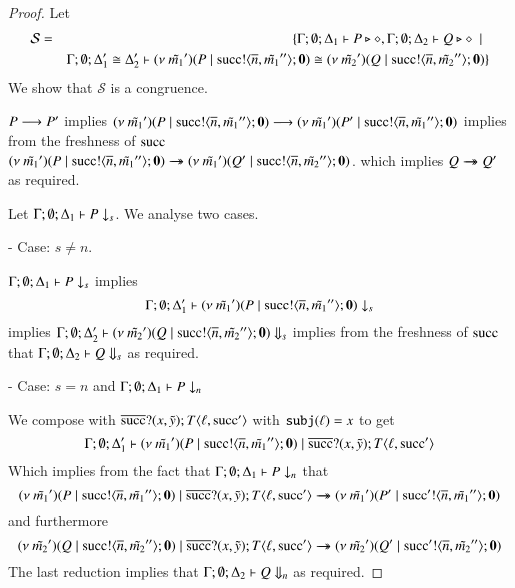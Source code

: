 \begin{proof}
	\noi Let
	\begin{eqnarray*}
		\mathcal{S} &=&	\{\Gamma; \emptyset; \Delta_1 \vdash P \triangleright \diamond, \Gamma; \emptyset; \Delta_2 \vdash Q \triangleright \diamond \ \ |\ \  \\
		& &	\Gamma; \emptyset; \Delta_1' \cong \Delta_2' \vdash (\nu\ \tilde{m_1}')(P \;|\; \textrm{succ} ! \langle \overline{n}, \tilde{m_1}'' \rangle ; \mathbf{0}) \cong (\nu\ \tilde{m_2}')(Q \;|\; \textrm{succ} ! \langle \overline{n}, \tilde{m_2}'' \rangle ; \mathbf{0})
		\}
	\end{eqnarray*}
	\noi We show that $\mathcal{S}$ is a congruence.


	\noi $P \longrightarrow P'$
	implies
	$(\nu\ \tilde{m_1}')(P \;|\; \textrm{succ} ! \langle \overline{n}, \tilde{m_1}'' \rangle ; \mathbf{0}) \longrightarrow (\nu\ \tilde{m_1}')(P' \;|\; \textrm{succ} ! \langle \overline{n}, \tilde{m_1}'' \rangle ; \mathbf{0})$
	implies from the freshness of $\textrm{succ}$
	$(\nu\ \tilde{m_1}')(P \;|\; \textrm{succ} ! \langle \overline{n}, \tilde{m_1}'' \rangle ; \mathbf{0}) \rightarrow\!\!\!\!\!\rightarrow (\nu\ \tilde{m_1}')(Q' \;|\; \textrm{succ} ! \langle \overline{n}, \tilde{m_2}'' \rangle ; \mathbf{0})$.
	which implies
	$Q \rightarrow\!\!\!\!\!\rightarrow Q'$ as required.


	\noi Let $\Gamma; \emptyset; \Delta_1 \vdash P \downarrow_{s}$. We analyse two cases.

	\noi - Case: $s \not= n$.

	\noi $\Gamma; \emptyset; \Delta_1 \vdash P \downarrow_{s}$
	implies
\[
	\Gamma; \emptyset; \Delta_1' \vdash (\nu\ \tilde{m_1}')(P \;|\; \textrm{succ} ! \langle \overline{n}, \tilde{m_1}'' \rangle ; \mathbf{0}) \downarrow_{s}
\]
	\noi implies
	$\Gamma; \emptyset; \Delta_2' \vdash (\nu\ \tilde{m_2}')(Q \;|\; \textrm{succ} ! \langle \overline{n}, \tilde{m_2}'' \rangle ; \mathbf{0}) \Downarrow_{s}$
	implies from the freshness of $\textrm{succ}$ that
	$\Gamma; \emptyset; \Delta_2 \vdash Q \Downarrow_{s}$ as required.

	\noi - Case: $s = n$ and $\Gamma; \emptyset; \Delta_1 \vdash P \downarrow_{n}$

	\noi We compose with $\overline{\textrm{succ}} ? (x, \tilde{y}) ; T\langle \ell, \textrm{succ}' \rangle$ with $\mathtt{subj}(\ell) = x$ to get
\[
	\Gamma; \emptyset; \Delta_1' \vdash (\nu\ \tilde{m_1}')(P \;|\; \textrm{succ} ! \langle \overline{n}, \tilde{m_1}'' \rangle ; \mathbf{0}) \;|\; \overline{\textrm{succ}} ? (x, \tilde{y}) ; T\langle \ell, \textrm{succ}' \rangle
\]
	\noi Which implies from the fact that $\Gamma; \emptyset; \Delta_1 \vdash P \downarrow_{n}$ that
\[
		(\nu\ \tilde{m_1}')(P \;|\; \textrm{succ} ! \langle \overline{n}, \tilde{m_1}'' \rangle ; \mathbf{0}) \;|\; \overline{\textrm{succ}} ? (x, \tilde{y}) ; T\langle \ell, \textrm{succ}' \rangle \rightarrow\!\!\!\!\!\rightarrow 
	(\nu\ \tilde{m_1}')(P' \;|\; \textrm{succ}' ! \langle \overline{n}, \tilde{m_1}'' \rangle ; \mathbf{0})
\]
	\noi and furthermore
\[
	(\nu\ \tilde{m_2}')(Q \;|\; \textrm{succ} ! \langle \overline{n}, \tilde{m_2}'' \rangle ; \mathbf{0}) \;|\; \overline{\textrm{succ}} ? (x, \tilde{y}) ; T\langle \ell, \textrm{succ}' \rangle \rightarrow\!\!\!\!\!\rightarrow 
	(\nu\ \tilde{m_2}')(Q' \;|\; \textrm{succ}' ! \langle \overline{n}, \tilde{m_2}'' \rangle ; \mathbf{0})
\]
	\noi The last reduction implies that
	$\Gamma; \emptyset; \Delta_2 \vdash Q \Downarrow_{n}$ as required.


\end{proof}
